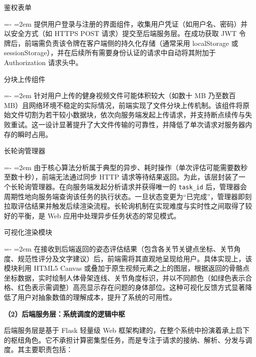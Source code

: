 \documentclass[UTF8,twoside]{ctexrep}
\makeatletter
\def@NAT@last@yr{\@citea}%
\def@NAT@last@yr{-\NAT@penalty}%
\newcommand{\researchitem}[2]{%
  \item #1%
  \par\begingroup
    \leftskip=-\leftmargin
    \rightskip=0pt
    \parindent=2em
    \noindent\hspace*{2em}\ignorespaces#2\unskip\par
  \endgroup
}
\makeatother
\begin{document}
\begin{researchlist}
  
\researchitem{鉴权表单}{
    提供用户登录与注册的界面组件，收集用户凭证（如用户名、密码）并以安全方式（如 HTTPS POST 请求）提交至后端服务层。在成功获取 JWT 令牌后，前端需负责该令牌在客户端侧的持久化存储（通常采用 localStorage 或 sessionStorage），并在后续所有需要身份认证的请求中自动将其附加于 Authorization 请求头中。
  }

  
\researchitem{分块上传组件}{
    针对用户上传的健身视频文件可能体积较大（如数十 MB 乃至数百 MB）且网络环境不稳定的实际情况，前端实现了文件分块上传机制。该组件将原始文件切割为若干较小数据块，依次向服务端发起上传请求，并支持断点续传与失败重试。这一设计显著提升了大文件传输的可靠性，并降低了单次请求对服务器内存的瞬时占用。
  }

  
\researchitem{长轮询管理器}{
    由于核心算法分析属于典型的异步、耗时操作（单次评估可能需要数秒至数十秒），前端无法通过同步 HTTP 请求等待结果返回。为此，该层封装了一个长轮询管理器。在向服务端发起分析请求并获得唯一的 \texttt{task\_id} 后，管理器会周期性地向服务端查询该任务的执行状态。一旦状态变更为“已完成”，管理器即刻拉取评估结果并触发后续渲染流程。长轮询机制在实现难度与实时性之间取得了较好的平衡，是 Web 应用中处理异步任务状态的常见模式。
  }

  
\researchitem{可视化渲染模块}{
    在接收到后端返回的姿态评估结果（包含各关节关键点坐标、关节角度、规范性评分及文字建议）后，前端需将其直观地呈现给用户。具体实现上，该模块利用 HTML5 Canvas 或叠加于原生视频元素之上的图层，根据返回的骨骼点坐标数据，实时绘制人体骨架连线、关节角度标识，并以不同颜色（如绿色表示合格、红色表示需调整）高亮显示存在问题的身体部位。这种可视化反馈方式显著降低了用户对抽象数值的理解成本，提升了系统的可用性。
  }
\end{researchlist}

\textbf{（2）后端服务层：系统调度的逻辑中枢}

后端服务层是基于 Flask 轻量级 Web 框架构建的，在整个系统中扮演着承上启下的枢纽角色。它不承担计算密集型任务，而是专注于请求的接纳、解析、分发与调度。其主要职责包括：
\end{document}

